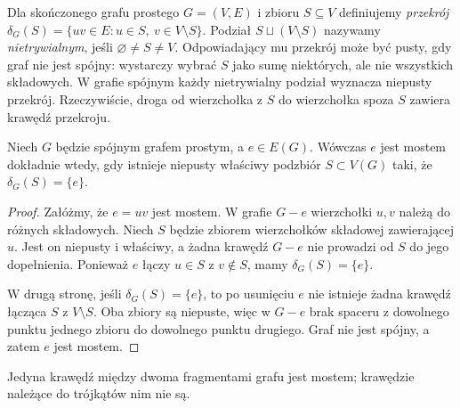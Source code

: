 \begin{definicja}
\label{def:tg-tree-edge-cut}
Dla skończonego grafu prostego $G=(V,E)$ i zbioru
$S\subseteq V$ definiujemy \emph{przekrój}
$\delta_G(S)=\{uv\in E:u\in S,\ v\in V\setminus S\}$.
Podział $S\sqcup(V\setminus S)$ nazywamy
\emph{nietrywialnym}, jeśli $\varnothing\ne S\ne V$.
Odpowiadający mu przekrój może być pusty, gdy graf
nie jest spójny: wystarczy wybrać $S$ jako sumę
niektórych, ale nie wszystkich składowych.
W grafie spójnym każdy nietrywialny podział
wyznacza niepusty przekrój. Rzeczywiście,
droga od wierzchołka z $S$ do wierzchołka spoza
$S$ zawiera krawędź przekroju.
\end{definicja}

\begin{stwierdzenie}
Niech $G$ będzie spójnym grafem prostym,
a $e\in E(G)$. Wówczas $e$ jest mostem
dokładnie wtedy, gdy istnieje niepusty
właściwy podzbiór $S\subset V(G)$ taki, że
$\delta_G(S)=\{e\}$.
\end{stwierdzenie}

\begin{proof}
Załóżmy, że $e=uv$ jest mostem. W grafie
$G-e$ wierzchołki $u,v$ należą do różnych
składowych. Niech $S$ będzie zbiorem
wierzchołków składowej zawierającej $u$.
Jest on niepusty i właściwy, a żadna krawędź
$G-e$ nie prowadzi od $S$ do jego dopełnienia.
Ponieważ $e$ łączy $u\in S$ z $v\notin S$,
mamy $\delta_G(S)=\{e\}$.

W drugą stronę, jeśli $\delta_G(S)=\{e\}$,
to po usunięciu $e$ nie istnieje żadna
krawędź łącząca $S$ z $V\setminus S$.
Oba zbiory są niepuste, więc w $G-e$
brak spaceru z dowolnego punktu jednego
zbioru do dowolnego punktu drugiego.
Graf nie jest spójny, a zatem $e$ jest mostem.
\end{proof}

\begin{center}

{\footnotesize Jedyna krawędź między dwoma fragmentami
grafu jest mostem; krawędzie należące do trójkątów nim nie są.}
\end{center}

